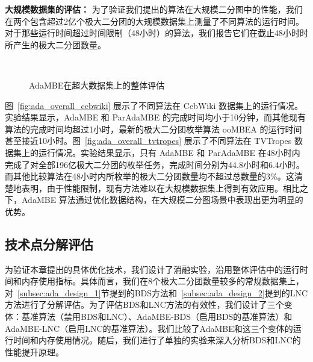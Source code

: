 \textbf{大规模数据集的评估：} 为了验证我们提出的算法在大规模二分图中的性能，我们在两个包含超过2亿个极大二分团的大规模数据集上测量了不同算法的运行时间。对于那些运行时间超过时间限制（48小时）的算法，我们报告它们在截止48小时时所产生的极大二分团数量。

\begin{figure} [H]
  \centering
	\\

  \caption{AdaMBE在超大数据集上的整体评估}
  \label{fig:ada_overall_large}
\end{figure}


图~\ref{fig:ada_overall_cebwiki} 展示了不同算法在 CebWiki 数据集上的运行情况。实验结果显示，AdaMBE 和 ParAdaMBE 的完成时间均小于10分钟，而其他现有算法的完成时间均超过1小时，最新的极大二分团枚举算法 ooMBEA 的运行时间甚至接近10小时。图~\ref{fig:ada_overall_tvtropes} 展示了不同算法在 TVTropes 数据集上的运行情况。实验结果显示，只有 AdaMBE 和 ParAdaMBE 在48小时内完成了对全部196亿极大二分团的枚举任务，完成时间分别为44.8小时和6.4小时。而其他比较算法在48小时内所枚举的极大二分团数量均不超过总数量的3\%。这清楚地表明，由于性能限制，现有方法难以在大规模数据集上得到有效应用。相比之下，AdaMBE 算法通过优化数据结构，在大规模二分图场景中表现出更为明显的优势。

\subsection{技术点分解评估}
\label{subsec:ada_breakdown}

为验证本章提出的具体优化技术，我们设计了消融实验，沿用整体评估中的运行时间和内存使用指标。具体而言，我们在8个极大二分团数量较多的常规数据集上，对~\ref{subsec:ada_design_1}节提到的BDS方法和~\ref{subsec:ada_design_2}提到的LNC方法进行了分解评估。为了评估BDS和LNC方法的有效性，我们设计了三个变体：基准算法（禁用BDS和LNC）、AdaMBE-BDS（启用BDS的基准算法）和AdaMBE-LNC（启用LNC的基准算法）。我们比较了AdaMBE和这三个变体的运行时间和内存使用情况。随后，我们进行了单独的实验来深入分析BDS和LNC的性能提升原理。

